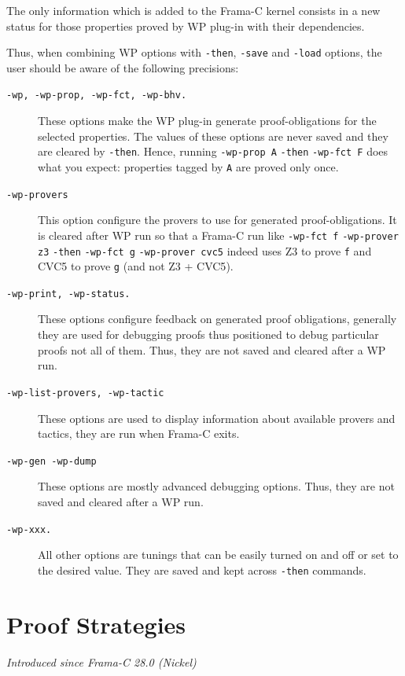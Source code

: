 The only information which is added to the \textsf{Frama-C} kernel
consists in a new status for those properties proved by \textsf{WP} plug-in with
their dependencies.

Thus, when combining \textsf{WP}
options with \texttt{-then}, \texttt{-save} and \texttt{-load}
options, the user should be aware of the following precisions:
\begin{description}
\item[\tt -wp, -wp-prop, -wp-fct, -wp-bhv.] These options make the
  \textsf{WP} plug-in generate proof-obligations for the selected
  properties. The values of these options are never saved and they are
  cleared by \texttt{-then}. Hence, running \texttt{-wp-prop A}
  \texttt{-then} \texttt{-wp-fct F} does what you expect:
  properties tagged by \texttt{A} are proved only once.
\item[\tt -wp-provers] This option configure the provers to use for
  generated proof-obligations. It is cleared after \textsf{WP} run so that a
  \textsf{Frama-C} run like \texttt{-wp-fct f} \texttt{-wp-prover z3} \texttt{-then}
  \texttt{-wp-fct g} \texttt{-wp-prover cvc5} indeed uses \textsf{Z3} to prove
  \texttt{f} and \textsf{CVC5} to prove \texttt{g} (and not \textsf{Z3} +
  \textsf{CVC5}).
\item[\tt -wp-print, -wp-status.]
  These options configure feedback on generated proof obligations, generally
  they are used for debugging proofs thus positioned to debug particular proofs
  not all of them. Thus, they are not saved and cleared after a \textsf{WP} run.
\item[\tt -wp-list-provers, -wp-tactic]
  These options are used to display information about available provers and
  tactics, they are run when \textsf{Frama-C} exits.
\item[\tt -wp-gen -wp-dump]
  These options are mostly advanced debugging options. Thus, they are not saved
  and cleared after a \textsf{WP} run.
\item[\tt -wp-xxx.] All other options are tunings that can be easily turned on
  and off or set to the desired value. They are saved and kept across
  \texttt{-then} commands.
\end{description}

\section{Proof Strategies}
\label{wp-proof-strategies}

\emph{Introduced since Frama-C 28.0 (Nickel)}

